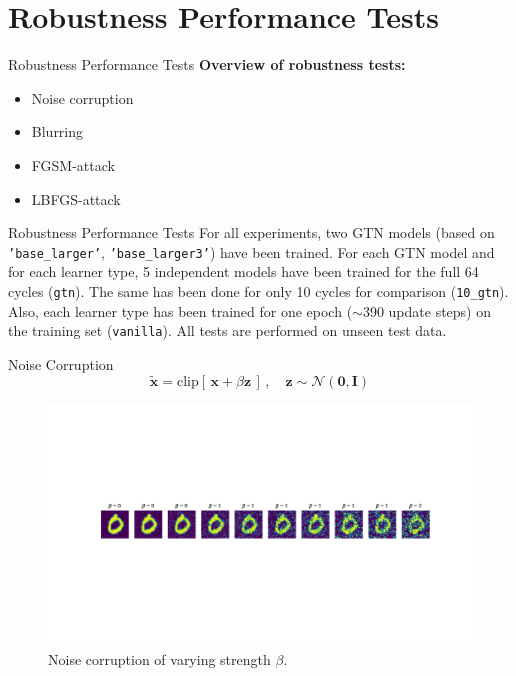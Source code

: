 \documentclass[10pt,usenames,dvipsnames]{beamer}
\renewcommand\vec[1]{\boldsymbol{\mathbf {#1}}}
\newcommand\doubleminipage[2]{
\begin{figure}[H]
\centering
\centerline{
\begin{minipage}{0.5\textwidth}
    \caption*{\footnotesize GTN trained with \texttt{'base\_larger'}}%
    \texttt{[image: figures/base\_larger\_\#1.pdf]}
\end{minipage}%
\begin{minipage}{0.5\textwidth}
    \caption*{\footnotesize GTN trained with \texttt{'base\_larger3'}}%
    \texttt{[image: figures/base\_larger3\_\#1.pdf]}
\end{minipage}
}
\caption{#2%
\label{fig:results_#1}
}
\end{figure}
}
\begin{document}
\section{Robustness Performance Tests}

\begin{frame}{Robustness Performance Tests}
    \textbf{Overview of robustness tests:}
    \begin{itemize}
        \item Noise corruption
        \item Blurring
        \item FGSM-attack
        \item LBFGS-attack
    \end{itemize}
\end{frame}

\begin{frame}{Robustness Performance Tests}
    For all experiments, two GTN models 
    (based on \texttt{'base\_larger'}, \texttt{'base\_larger3'}) have been trained.
    For each GTN model and for each learner type,
    5 independent models have been trained for the full 64 cycles (\texttt{gtn}).
    The same has been done for only 10 cycles for comparison (\texttt{10\_gtn}).
    Also, each learner type has been trained for one epoch ($\sim$390 update steps)
    on the training set (\texttt{vanilla}).
    All tests are performed on unseen test data.
\end{frame}

\begin{frame}{Noise Corruption}
    $$
    \tilde {\vec x} = \text{clip}[\,\vec x + \beta \vec z\,] \,, \quad \vec z \sim \mathcal N(\vec 0, \vec I)
    $$
    
    \begin{figure}[H]
        \centering
        \includegraphics[trim=200 250 100 200, clip, width=\textwidth]{figures/samples_noise.pdf}
        \caption{Noise corruption of varying strength $\beta$.}
        \label{fig:samples_noise}
    \end{figure}
\end{frame}
\end{document}
